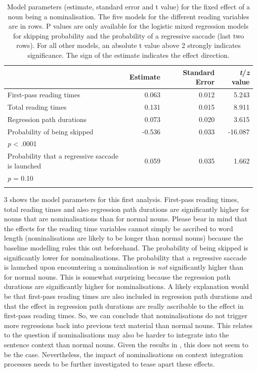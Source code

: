 \documentclass[output=paper]{langsci/langscibook}
\begin{document}
\begin{table}
\begin{tabularx}{\textwidth}{Xrrr}
\lsptoprule
 & Estimate & Standard Error & \textit{t}/\textit{z} value\\
\midrule 
 First-pass reading times & 0.063 & 0.012 & 5.243\\
 Total reading times & 0.131 & 0.015 & 8.911\\
 Regression path durations & 0.073 & 0.020 & 3.615\\
 Probability of being skipped & {}-0.536 & 0.033 & {}-16.087\\
\textit{p} {\textless} .0001\\
 Probability that a regressive saccade is launched & 0.059 & 0.035 & 1.662\\
\textit{p} = 0.10\\
\lspbottomrule
\end{tabularx}
\caption{Model parameters (estimate, standard error and t value) for the fixed effect of a noun being a nominalisation. The five models for the different reading variables are in rows. P values are only available for the logistic mixed regression models for skipping probability and the probability of a regressive saccade (last two rows). For all other models, an absolute t value above 2 strongly indicates significance. The sign of the estimate indicates the effect direction.}
\label{wolfer:tab:3}
\end{table}
3 shows the model parameters for this first analysis. First-pass reading times, total reading times and also regression path durations are significantly higher for nouns that are nominalisations than for normal nouns. Please bear in mind that the effects for the reading time variables cannot simply be ascribed to word length (nominalisations are likely to be longer than normal nouns) because the baseline modelling rules this out beforehand. The probability of being skipped is significantly lower for nominalisations. The probability that a regressive saccade is launched upon encountering a nominalisation is \textit{not} significantly higher than for normal nouns. This is somewhat surprising because the regression path durations are significantly higher for nominalisations. A likely explanation would be that first-pass reading times are also included in regression path durations and that the effect in regression path durations are really ascribable to the effect in first-pass reading times. So, we can conclude that nominalisations do not trigger more regressions back into previous text material than normal nouns. This relates to the question if nominalisations may also be harder to integrate into the sentence context than normal nouns. Given the results in , this does not seem to be the case. Nevertheless, the impact of nominalisations on context integration processes needs to be further investigated to tease apart these effects.
\end{document}
